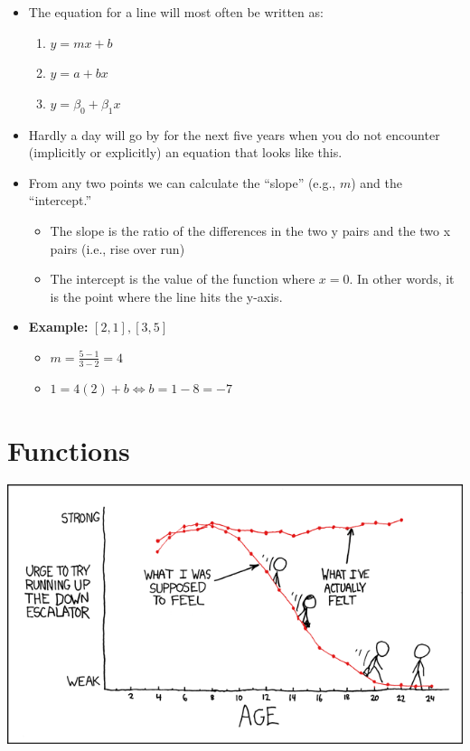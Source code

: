 \documentclass[20pt]{extarticle}
\newcommand{\bi}{\begin{itemize}}
\newcommand{\ei}{\end{itemize}}
\newcommand{\be}{\begin{enumerate}}
\newcommand{\ee}{\end{enumerate}}
\begin{document}
\bi
\item The equation for a line will most often be written as:
\be
\item $y=mx + b$ 
\item $y=a+bx$
\item $y=\beta_0 + \beta_1x$
\ee
\item Hardly a day will go by for the next five years when you do not
  encounter (implicitly or explicitly) an equation that looks like
  this.
\item From any two points we can calculate the ``slope'' (e.g., $m$) and
  the ``intercept.''
\bi
\item The slope is the ratio of the differences in the two y pairs and
  the two x pairs (i.e., rise over run)
\item The intercept is the value of the function where $x=0$.  In
  other words, it is the point where the line hits the y-axis.
\ei
\item\textbf{ Example:} ${[2,1], [3,5]}$
\bi
\item$ m = \frac{5-1}{3-2}=4$
\item $1 = 4(2) + b \iff b=1-8=-7$
\ei 
\ei


\section{Functions}
\begin{centering}
\includegraphics[width=6in]{escalators}
\end{centering}
\end{document}
